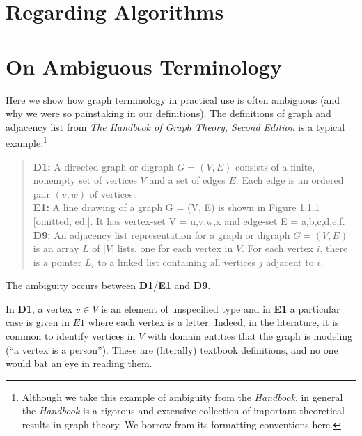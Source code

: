 \section{Regarding Algorithms}



\appendix

\section{On Ambiguous Terminology}
\label{sec:ambiguity}

Here we show how graph terminology in practical use is often ambiguous (and why we were so painstaking in our definitions).
The definitions of graph and adjacency list from \emph{The Handbook of Graph Theory, Second Edition} is a typical
example:\footnote{
Although we take this example of ambiguity
from the \emph{Handbook}, in general the \emph{Handbook} is a rigorous and extensive collection of
important theoretical results in graph theory.  We borrow from its formatting conventions here.
}
\begin{quote}
  \textbf{D1:} A directed graph or digraph $G = (V,E)$ consists of a finite, nonempty set of vertices $V$ and a set of edges $E$.
Each edge is an ordered pair $(v,w)$ of vertices.
\\[\medskipamount]
\textbf{E1:} A line drawing of a graph G = (V, E) is shown in Figure 1.1.1 [omitted, ed.]. It has vertex-set V = {u,v,w,x} and
edge-set E = {a,b,c,d,e,f}.
\\[\medskipamount]
\textbf{D9:} An adjacency list representation for a graph or digraph $G = (V, E)$ is an array $L$ of $|V|$ lists, one for each
vertex in $V$. For each vertex $i$, there is a pointer $L_i$ to a linked list containing all vertices $j$ adjacent to $i$.
\end{quote}
The ambiguity occurs between \textbf{D1}/\textbf{E1} and \textbf{D9}.

In \textbf{D1}, a vertex $v \in V$ is an element of unspecified type and in \textbf{E1} a particular case is given in $E1$ where
each vertex is a letter.  Indeed, in the literature, it is common to identify vertices in $V$ with domain entities that the graph
is modeling (``a vertex is a person'').  These are (literally) textbook definitions, and no one would bat an eye in reading them.

